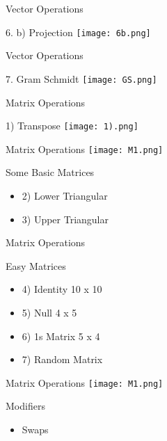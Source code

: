 \documentclass[10pt]{beamer}
\begin{document}
\begin{frame}{Vector Operations}
\begin{block}{6. b) Projection}
\center
\texttt{[image: 6b.png]}
\end{block}
\end{frame}


\begin{frame}{Vector Operations}
\begin{block}{7. Gram Schmidt}
\center
\texttt{[image: GS.png]}
\end{block}
\end{frame}

\begin{frame}{Matrix Operations}
\begin{block}{1) Transpose}
\center
\texttt{[image: 1).png]}
\end{block}
\end{frame}
\begin{frame}{Matrix Operations}
\texttt{[image: M1.png]}
\begin{block}{Some Basic Matrices}
\begin{itemize}
\item 2) Lower Triangular
\item 3) Upper Triangular
\end{itemize}
\end{block}
\end{frame}
\begin{frame}{Matrix Operations}
\begin{block}{Easy Matrices}
\begin{itemize}
\item 4) Identity 10 x 10 
\item 5) Null 4 x 5
\item 6) 1s Matrix 5 x 4
\item 7) Random Matrix
\end{itemize}
\end{block}
\end{frame}

\begin{frame}{Matrix Operations}
\texttt{[image: M1.png]}
\begin{block}{Modifiers}
\begin{itemize}
\item Swaps
\end{itemize}

\end{block}

\end{frame}
\end{document}
